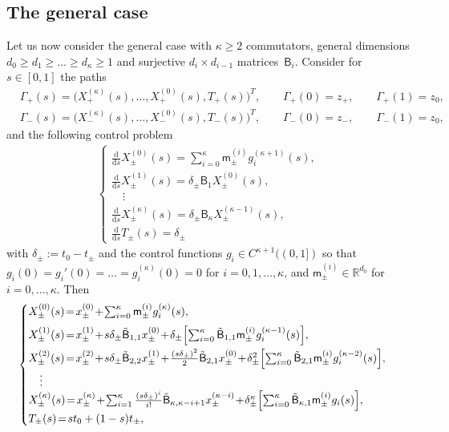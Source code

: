 \documentclass[10pt]{amsart}
\theoremstyle{definition}
\newcommand\R{{\mathbb R}}
\newcommand{\sB}{{\mathsf B}}
\newcommand\ds{{\frac{\mathrm d}{\mathrm ds}}}
\begin{document}
\subsection{The general case}

Let us now consider the general case with $\kappa \ge 2$
commutators, general dimensions
$d_0 \geq d_1 \geq \dots \geq d_{\kappa}\geq 1$ and surjective
$d_i \times d_{i-1}$ matrices~$\sB_i$. Consider for $s \in [0,1]$
the paths
\begin{equation*}
\begin{aligned}
& \Gamma_+(s) = \bigl(X^{(\kappa)}_+(s), \dots, X^{(0)}_+(s),
T_+(s)\bigr)^T, \qquad \Gamma_+(0) = z_+, \qquad \Gamma_+(1) =
z_0,\\
& \Gamma_-(s) = \bigl(X^{(\kappa)}_-(s), \dots, X^{(0)}_-(s),
T_-(s)\bigr)^T, \qquad \Gamma_-(0) = z_-, \qquad \Gamma_-(1) =
z_0,
\end{aligned}
\end{equation*}
and the following control problem
\begin{equation}
\label{eq:control-general}
\begin{aligned}
\begin{cases}
\ds X^{(0)}_{\pm}(s)
= \sum_{i=0} ^\kappa
\mathsf m_\pm ^{(i)} g_i^{(\kappa+1)} (s), \\[5pt]
\ds X^{(1)}_\pm(s) = \delta_\pm \sB_1 X^{(0)}_\pm(s),\\
\quad \vdots \\
\ds X^{(\kappa)}_\pm(s) = \delta_\pm \sB_\kappa X^{(\kappa-1)}_\pm(s), \\[5pt]
\ds T_\pm(s) = \delta_\pm
\end{cases}
\end{aligned}
\end{equation}
with $\delta_\pm := t_0 - t_\pm$ and the control functions
$g_i \in C^{\kappa +1}((0,1])$ so that
$g_i(0)=g_i'(0)= \dots =g_i^{(\kappa)}(0)=0$ for
$i=0,1,\dots,\kappa$, and $\mathsf m^{(i)} _\pm \in \R^{d_0}$ for
$i=0,\dots,\kappa$. Then
\begin{equation}
\label{eq:control-solved-general}
\begin{cases}
X^{(0)}_{\pm}(s) \!=\! x^{(0)} _\pm \!+\! \sum_{i=0} ^\kappa
\mathsf m_\pm ^{(i)}
g_i^{(\kappa)}(s), \\[5pt]
X^{(1)}_\pm(s) \!=\! x^{(1)} _\pm  \!+\! s \delta_\pm \tilde \sB_{1,1} x^{(0)} _\pm  \!+\!
\delta_\pm \Bigl[ \sum_{i=0} ^\kappa \tilde \sB_{1,1} \mathsf
m_\pm ^{(i)} g_i^{(\kappa-1)} (s) \Bigr],\\[5pt]
X^{(2)}_\pm(s) \!=\! x^{(2)} _\pm  \!+\! s \delta_\pm \tilde
\sB_{2,2} x^{(1)} _\pm  \!+\!
\frac{(s\delta_\pm)^2}{2} \tilde \sB_{2,1} x^{(0)} _\pm \!+\!
\delta_\pm ^2 \Bigl[ \sum_{i=0} ^\kappa \tilde \sB_{2,1} \mathsf m_\pm
^{(i)} g_i^{(\kappa-2)}(s) \Bigr],\\
\quad \vdots \\
X^{(\kappa)}_\pm(s) \!=\! x_\pm ^{(\kappa)}  \!+\! \sum_{i=1} ^\kappa \frac{(s
\delta_\pm)^i}{i!} \tilde \sB_{\kappa,\kappa-i+1} x^{(\kappa-i)} _\pm \!+\! \delta_\pm
^\kappa \Bigl[ \sum_{i=0} ^\kappa \tilde \sB_{\kappa,1} \mathsf
m_\pm ^{(i)} g_i (s) \Bigr],\\
T_\pm(s) \!=\! s t_0 + (1-s) t_\pm,
\end{cases}
\end{equation}
\end{document}
